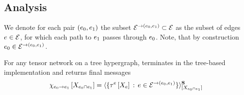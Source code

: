 \subsection{Analysis}

We denote for each pair $(e_{0},e_{1})$ the subset $\mathcal{E}^{\rightarrow(e_{0},e_{1})}\subset\mathcal{E}$ as the subset of edges $e\in\mathcal{E}$, for which each path to $e_{1}$ passes through $e_{0}$.
Note, that by construction $e_{0}\in\mathcal{E}^{\rightarrow(e_{0},e_{1})}$.

\begin{theorem}
    \label{the:mpGuaranteeTree}
    For any tensor network on a tree hypergraph,  terminates in the tree-based implementation and returns final messages
    \begin{align*}
        \chi_{e_{0} \rightarrow e_{1}}\left[X_{e_{0} \cap e_{1}}\right]
        = \langle\{\tau^{e}\left[X_{e}\right]\,:\,e\in\mathcal{E}^{\rightarrow(e_{0},e_{1})}\}\rangle^{\mathbf{S}}_{[X_{e_{0}\cap e_{1}}]}
    \end{align*}
\end{theorem}
